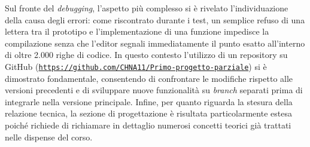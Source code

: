 \documentclass[11pt,a4paper,oneside,openany]{book}
\begin{document}
Sul fronte del \emph{debugging}, l'aspetto più complesso si è rivelato l'individuazione della causa degli errori: come riscontrato durante i test, un semplice refuso di una lettera tra il prototipo e l'implementazione di una funzione impedisce la compilazione senza che l'editor segnali immediatamente il punto esatto all'interno di oltre 2.000 righe di codice. In questo contesto l'utilizzo di un repository su GitHub (\href{https://github.com/CHNA11/Primo-progetto-parziale}{\texttt{https://github.com/CHNA11/Primo-progetto-parziale}}) si è dimostrato fondamentale, consentendo di confrontare le modifiche rispetto alle versioni precedenti e di sviluppare nuove funzionalità su \emph{branch} separati prima di integrarle nella versione principale. Infine, per quanto riguarda la stesura della relazione tecnica, la sezione di progettazione è risultata particolarmente estesa poiché richiede di richiamare in dettaglio numerosi concetti teorici già trattati nelle dispense del corso.
\end{document}
